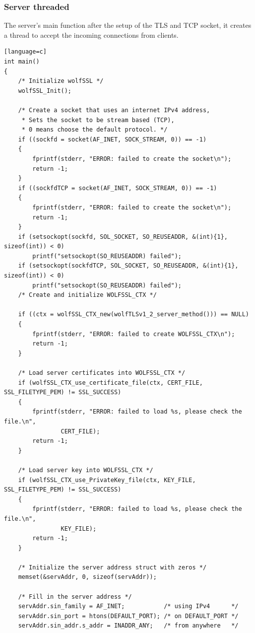 \documentclass[a4paper,12pt]{article}
\begin{document}
\subsubsection{Server threaded }
The server's main function after the setup of the TLS and TCP socket, it creates a thread to accept the incoming connections from clients.
\begin{lstlisting}[caption={int main() of TLS server},captionpos=b][language=c]
int main()
{
    /* Initialize wolfSSL */
    wolfSSL_Init();

    /* Create a socket that uses an internet IPv4 address,
     * Sets the socket to be stream based (TCP),
     * 0 means choose the default protocol. */
    if ((sockfd = socket(AF_INET, SOCK_STREAM, 0)) == -1)
    {
        fprintf(stderr, "ERROR: failed to create the socket\n");
        return -1;
    }
    if ((sockfdTCP = socket(AF_INET, SOCK_STREAM, 0)) == -1)
    {
        fprintf(stderr, "ERROR: failed to create the socket\n");
        return -1;
    }
    if (setsockopt(sockfd, SOL_SOCKET, SO_REUSEADDR, &(int){1}, sizeof(int)) < 0)
        printf("setsockopt(SO_REUSEADDR) failed");
    if (setsockopt(sockfdTCP, SOL_SOCKET, SO_REUSEADDR, &(int){1}, sizeof(int)) < 0)
        printf("setsockopt(SO_REUSEADDR) failed");
    /* Create and initialize WOLFSSL_CTX */

    if ((ctx = wolfSSL_CTX_new(wolfTLSv1_2_server_method())) == NULL)
    {
        fprintf(stderr, "ERROR: failed to create WOLFSSL_CTX\n");
        return -1;
    }

    /* Load server certificates into WOLFSSL_CTX */
    if (wolfSSL_CTX_use_certificate_file(ctx, CERT_FILE, SSL_FILETYPE_PEM) != SSL_SUCCESS)
    {
        fprintf(stderr, "ERROR: failed to load %s, please check the file.\n",
                CERT_FILE);
        return -1;
    }

    /* Load server key into WOLFSSL_CTX */
    if (wolfSSL_CTX_use_PrivateKey_file(ctx, KEY_FILE, SSL_FILETYPE_PEM) != SSL_SUCCESS)
    {
        fprintf(stderr, "ERROR: failed to load %s, please check the file.\n",
                KEY_FILE);
        return -1;
    }

    /* Initialize the server address struct with zeros */
    memset(&servAddr, 0, sizeof(servAddr));

    /* Fill in the server address */
    servAddr.sin_family = AF_INET;           /* using IPv4      */
    servAddr.sin_port = htons(DEFAULT_PORT); /* on DEFAULT_PORT */
    servAddr.sin_addr.s_addr = INADDR_ANY;   /* from anywhere   */


\end{lstlisting}
\end{document}
